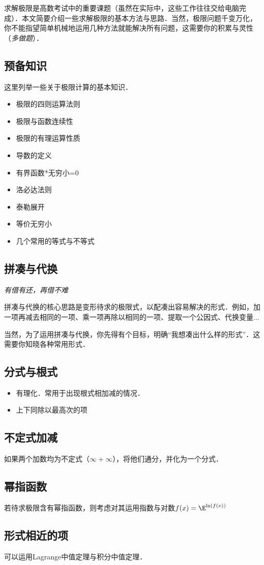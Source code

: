 
\begin{issues}
\issueDraft
\end{issues}

求解极限是高数考试中的重要课题（虽然在实际中，这些工作往往交给电脑完成）．本文简要介绍一些求解极限的基本方法与思路．当然，极限问题千变万化，你不能指望简单机械地运用几种方法就能解决所有问题，这需要你的积累与灵性（\textsl{多做题}）．

\subsection{预备知识}
这里列举一些关于极限计算的基本知识．
\begin{itemize}
\item 极限的四则运算法则
\item 极限与函数连续性
\item 极限的有理运算性质
\item 导数的定义
\item 有界函数*无穷小=0
\item 洛必达法则
\item 泰勒展开
\item 等价无穷小
\item 几个常用的等式与不等式
\end{itemize}

\subsection{拼凑与代换}
\textsl{有借有还，再借不难}

拼凑与代换的核心思路是变形待求的极限式，以配凑出容易解决的形式．例如，加一项再减去相同的一项、乘一项再除以相同的一项、提取一个公因式、代换变量...

当然，为了运用拼凑与代换，你先得有个目标，明确“我想凑出什么样的形式”．这需要你知晓各种常用形式．

\subsection{分式与根式}
\begin{itemize}
\item 有理化．常用于出现根式相加减的情况．
\item 上下同除以最高次的项
\end{itemize}

\subsection{不定式加减}
如果两个加数均为不定式（$\infty+\infty$），将他们通分，并化为一个分式．

\subsection{幂指函数}
若待求极限含有幂指函数，则考虑对其运用指数与对数$f(x)=\E^{\ln(f(x))}$

\subsection{形式相近的项}
可以运用Lagrange中值定理与积分中值定理．
